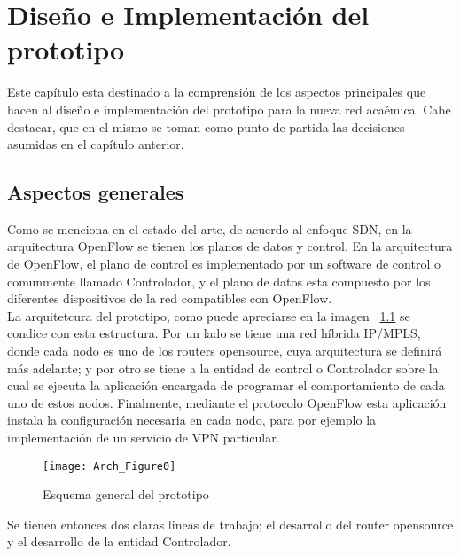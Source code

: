 \chapter{Dise\~no e Implementaci\'on del prototipo}

\ifpdf
    \graphicspath{{Chapter4/Figs/Raster/}{Chapter4/Figs/PDF/}{Chapter4/Figs/}}
\else
    \graphicspath{{Chapter4/Figs/Vector/}{Chapter4/Figs/}}
\fi

Este cap\'itulo esta destinado a la comprensi\'on de los aspectos principales que hacen al dise\~no e implementaci\'on del prototipo para la nueva red aca\'emica. Cabe destacar, que en el mismo se toman como punto de partida las decisiones asumidas en el cap\'itulo anterior.

\section{Aspectos generales}

Como se menciona en el estado del arte, de acuerdo al enfoque SDN, en la arquitectura OpenFlow se tienen los planos de datos y control. En la arquitectura de OpenFlow, el plano de control es implementado por un software de control o comunmente llamado Controlador, y el plano de datos esta compuesto por los diferentes dispositivos de la red compatibles con OpenFlow.\\

La arquitetcura del prototipo, como puede apreciarse en la imagen ~\ref{fig:OpenSourceRArch0} se condice con esta estructura. Por un lado se tiene una red h\'ibrida IP/MPLS, donde cada nodo es uno de los routers opensource, cuya arquitectura se definir\'a m\'as adelante; y por otro se tiene a la entidad de control o Controlador sobre la cual se ejecuta la aplicaci\'on encargada de programar el comportamiento de cada uno de estos nodos. Finalmente, mediante el protocolo OpenFlow esta aplicaci\'on instala la configuraci\'on necesaria en cada nodo, para por ejemplo la implementaci\'on de un servicio de VPN particular.\\

\newpage
\begin{figure}[htbp!] 
\centering    
\texttt{[image: Arch\_Figure0]}
\caption[OpenSourceRArch0]{Esquema general del prototipo}
\label{fig:OpenSourceRArch0}
\end{figure}

Se tienen entonces dos claras lineas de trabajo; el desarrollo del router opensource y el desarrollo de la entidad Controlador. 

